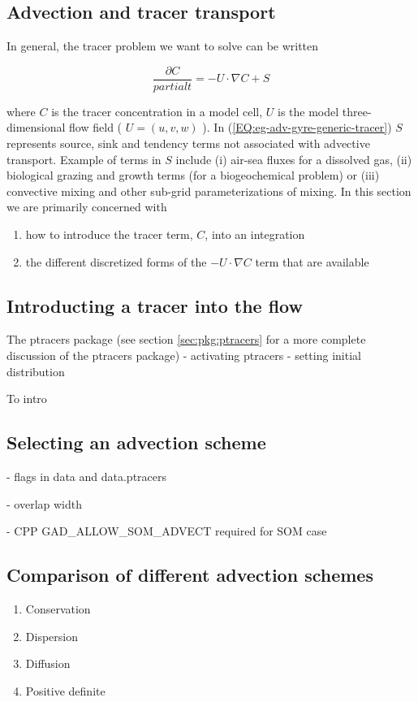 \subsection{Advection and tracer transport}

In general, the tracer problem we want to solve can be written

\begin{equation}
\label{EQ:eg-adv-gyre-generic-tracer}
\frac{\partial C}{partial t} = -U \cdot \nabla C + S
\end{equation}

where $C$ is the tracer concentration in a model cell, $U$ is the model three-dimensional
flow field ( $U=(u,v,w)$ ). In (\ref{EQ:eg-adv-gyre-generic-tracer}) $S$ represents source, sink 
and tendency terms not associated with advective transport. Example of terms in $S$ include
(i) air-sea fluxes for a dissolved gas, (ii) biological grazing and growth terms (for a 
biogeochemical problem) or (iii) convective mixing and other sub-grid parameterizations of 
mixing. In this section we are primarily concerned with 
\begin{enumerate}
\item how to introduce the tracer term, $C$, into an integration
\item the different discretized forms of 
the $-U \cdot \nabla C$ term that are available
\end{enumerate}


\subsection{Introducting a tracer into the flow}

 The ptracers package (see section \ref{sec:pkg:ptracers} for a more complete discussion
of the ptracers package) 
- activating ptracers
- setting initial distribution

To intro
\subsection{Selecting an advection scheme}

- flags in data and data.ptracers

- overlap width

- CPP GAD\_ALLOW\_SOM\_ADVECT required for SOM case

\subsection{Comparison of different advection schemes}

\begin{enumerate}
\item{Conservation}
\item{Dispersion}
\item{Diffusion}
\item{Positive definite}
\end{enumerate}


 






